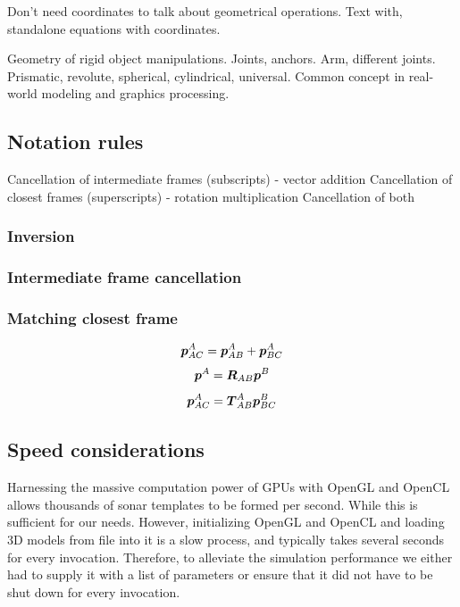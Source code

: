Don't need coordinates to talk about geometrical operations. Text with, standalone equations with coordinates.

Geometry of rigid object manipulations. Joints, anchors. Arm, different joints. Prismatic, revolute, spherical, cylindrical, universal. Common concept in real-world modeling and graphics processing.




\subsection{Notation rules}

Cancellation of intermediate frames (subscripts)   - vector addition
Cancellation of closest frames      (superscripts) - rotation multiplication
Cancellation of both

\subsubsection{Inversion}


\subsubsection{Intermediate frame cancellation}



\subsubsection{Matching closest frame}

$$\boldsymbol{p}_{AC}^A = \boldsymbol{p}_{AB}^A + \boldsymbol{p}_{BC}^A$$
$$\boldsymbol{p}^A = \boldsymbol{R}_{AB} \boldsymbol{p}^B$$
$$\boldsymbol{p}_{AC}^A = \boldsymbol{T}_{AB}^A \boldsymbol{p}_{BC}^B$$


\subsection{Speed considerations}

Harnessing the massive computation power of GPUs with OpenGL and OpenCL allows thousands of sonar templates to be formed per second. While this is sufficient for our needs. However, initializing OpenGL and OpenCL and loading 3D models from file into it is a slow process, and typically takes several seconds for every invocation. Therefore, to alleviate the simulation performance we either had to supply it with a list of parameters or ensure that it did not have to be shut down for every invocation. 

